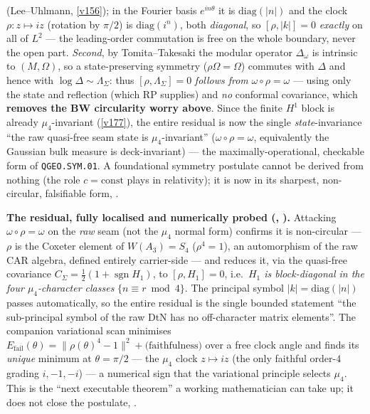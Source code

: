 \documentclass[11pt,a4paper]{article}
\begin{document}
\begin{keybox}
(Lee--Uhlmann, \vref{v156}); in the Fourier basis $e^{in\theta}$ it is $\mathrm{diag}(|n|)$ and the clock
$\rho:z\mapsto iz$ (rotation by $\pi/2$) is $\mathrm{diag}(i^n)$, both \emph{diagonal}, so
$[\rho,|k|]=0$ \emph{exactly} on all of $L^2$ --- the leading-order commutation is free on the whole
boundary, never the open part. \emph{Second}, by Tomita--Takesaki the modular operator $\Delta_\omega$ is
intrinsic to $(M,\Omega)$, so a state-preserving symmetry ($\rho\Omega=\Omega$) commutes with $\Delta$ and
hence with $\log\Delta\sim\Lambda_\Sigma$: thus $[\rho,\Lambda_\Sigma]=0$ \emph{follows from}
$\omega\circ\rho=\omega$ --- using only the state and reflection (which RP supplies) and \emph{no} conformal
covariance, which \textbf{removes the BW circularity worry above}. Since the finite $H^1$ block is already
$\mu_4$-invariant (\vref{v177}), the entire residual is now the single \emph{state}-invariance ``the raw
quasi-free seam state is $\mu_4$-invariant'' ($\omega\circ\rho=\omega$, equivalently the Gaussian bulk
measure is deck-invariant) --- the maximally-operational, checkable form of \texttt{QGEO.SYM.01}. A
foundational symmetry postulate cannot be derived from nothing (the role $c=\text{const}$ plays in
relativity); it is now in its sharpest, non-circular, falsifiable form, \mO.
\par\smallskip\noindent\textbf{The residual, fully localised and numerically probed
(, ).} Attacking
$\omega\circ\rho=\omega$ on the \emph{raw} seam (not the $\mu_4$ normal form) confirms it is non-circular
--- $\rho$ is the Coxeter element of $W(A_3)=S_4$ ($\rho^4=1$), an automorphism of the raw CAR algebra,
defined entirely carrier-side --- and reduces it, via the quasi-free covariance
$C_\Sigma=\tfrac12(1+\operatorname{sgn}H_1)$, to $[\rho,H_1]=0$, i.e.\ \emph{$H_1$ is block-diagonal in the
four $\mu_4$-character classes} $\{n\equiv r\bmod4\}$. The principal symbol $|k|=\mathrm{diag}(|n|)$ passes
automatically, so the entire residual is the single bounded statement ``the sub-principal symbol of the raw
DtN has no off-character matrix elements''. The companion variational scan minimises
$E_{\mathrm{fail}}(\theta)=\|\rho(\theta)^4-1\|^2+\text{(faithfulness)}$ over a free clock angle and finds
its \emph{unique} minimum at $\theta=\pi/2$ --- the $\mu_4$ clock $z\mapsto iz$ (the only faithful order-$4$
grading $i,-1,-i$) --- a numerical sign that the variational principle selects $\mu_4$. This is the
``next executable theorem'' a working mathematician can take up; it does not close the postulate, \mO.

\end{keybox}
\end{document}
